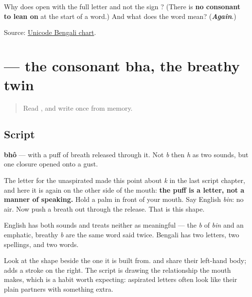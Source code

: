 \begin{tcolorbox}[breakable,colback=teal!4,colframe=teal!35!black,title={Before you move on}]
Why does \textbf{} open with the full letter \textbf{} and not the sign \textbf{}? (There is \textbf{no consonant to lean on} at the start of a word.) And what does the word mean? (\emph{\textbf{Again}}.)

Source: \href{https://www.unicode.org/charts/PDF/U0980.pdf}{Unicode Bengali chart}.
\end{tcolorbox}
\section[bhô]{ — the consonant bha, the breathy twin}

\label{lesson:BN-W03-bha}



\begin{quote}
Read \textbf{}, and write \textbf{} once from memory.
\end{quote}

\subsection*{Script}
\begin{quote}
\end{quote}

\textbf{bhô} — \textbf{} with a puff of breath released through it. Not \emph{b} then \emph{h} as two sounds, but one closure opened onto a gust.

The letter for the unaspirated \textbf{} made this point about \emph{k} in the last script chapter, and here it is again on the other side of the mouth: \textbf{the puff is a letter, not a manner of speaking.} Hold a palm in front of your mouth. Say English \emph{bin}: no air. Now push a breath out through the release. That is this shape.

English has both sounds and treats neither as meaningful — the \emph{b} of \emph{bin} and an emphatic, breathy \emph{b} are the same word said twice. Bengali has two letters, two spellings, and two words.

Look at the shape beside the one it is built from. \textbf{} and \textbf{} share their left-hand body; \textbf{} adds a stroke on the right. The script is drawing the relationship the mouth makes, which is a habit worth expecting: aspirated letters often look like their plain partners with something extra.

